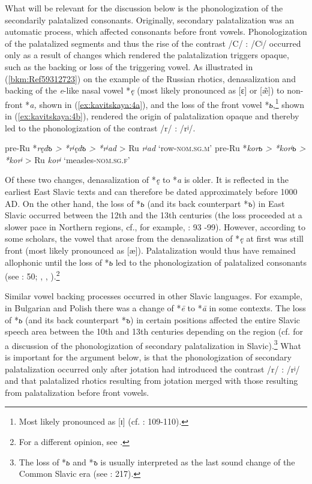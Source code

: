 \documentclass[output=paper]{langscibook}
\begin{document}
What will be relevant for the discussion below is the phonologization of the secondarily palatalized consonants. Originally, secondary palatalization was an automatic process, which affected consonants before front vowels. Phonologization of the palatalized segments and thus the rise of the contrast /C/ : /Cʲ/ occurred only as a result of changes which rendered the palatalization triggers opaque, such as the backing or loss of the triggering vowel. As illustrated in (\ref{bkm:Ref59312723}) on the example of the Russian rhotics, denasalization and backing of the \textit{e}{}-like nasal vowel *\textit{ę} (most likely pronounced as [ɛ] or [\~{æ}]) to non-front *\textit{a,} shown in (\ref{ex:kavitskaya:4a}), and the loss of the front vowel *\textit{{ь}},\footnote{Most
  likely pronounced as [ɪ] (cf. \citealt{Matthews1951}: 109-110).
} shown in (\ref{ex:kavitskaya:4b}), rendered the origin of palatalization opaque and thereby led to the phonologization of the contrast /r/ : /rʲ/.


\ea \label{bkm:Ref59312723}
\ea  \label{ex:kavitskaya:4a} pre-Ru *\textit{ręd{ъ} > *\textit{r}ʲęd{ъ} > *\textit{r}ʲad} > Ru \textit{rʲad} ‘row-\textsc{nom.sg.m}’
 \ex \label{ex:kavitskaya:4b} pre-Ru *\textit{kor{ь} > *\textit{kor}ʲ{ь} > *\textit{kor}ʲ} > Ru \textit{korʲ} ‘measles-\textsc{nom.sg.f}’
 \z
 \z

Of these two changes, denasalization of *\textit{ę} to *\textit{a} is older. It is reflected in the earliest East Slavic texts and can therefore be dated approximately before 1000 AD. On the other hand, the loss of *\textit{{ь}} (and its back counterpart *\textit{{ъ}}) in East Slavic occurred between the 12th and the 13th centuries (the loss proceeded at a slower pace in Northern regions, cf., for example, \citealt{Kiparsky1963}: 93 -99). However, according to some scholars, the vowel that arose from the denasalization of *\textit{ę} at first was still front (most likely pronounced as [æ]). Palatalization would thus have remained allophonic until the loss of *\textit{{ь}} led to the phonologization of palatalized consonants (see \citealt{Jakobson1929}: 50; \citealt{Lunt1956}, \citealt[33--34]{Kalnyn1961}, \citealt{Živov1996}).\footnote{For a different opinion, see \citet{vanWijk1934,vanWijk1937}.}

Similar vowel backing processes occurred in other Slavic languages. For example, in Bulgarian and Polish there was a change of *\textit{ē} to *\textit{ā} in some contexts. The loss of *\textit{{ь}} (and its back counterpart *\textit{{ъ}}) in certain positions affected the entire Slavic speech area between the 10th and 13th centuries depending on the region (cf. \citealt{Kalnyn1961} for a discussion of the phonologization of secondary palatalization in Slavic).\footnote{The loss of *\textit{{ь}} and *\textit{{ъ}} is usually interpreted as the last sound change of the Common Slavic era (see \citealt{Trubetzkoy1922}: 217).} What is important for the argument below, is that the phonologization of secondary palatalization occurred only after jotation had introduced the contrast /r/ : /rʲ/ and that palatalized rhotics resulting from jotation merged with those resulting from palatalization before front vowels.
\end{document}
